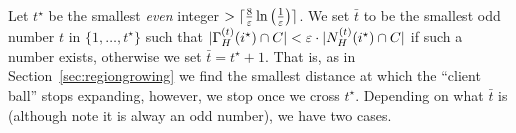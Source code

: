 \def\t{\bar{t}}
Let $t^\star$ be the smallest {\em even} integer $> \lceil\frac{8}{\varepsilon}\ln\left(\frac{1}{\varepsilon}\right)\rceil$. We set $\t$ to be the smallest odd number $t$ in $\{1,\ldots,t^\star\}$ such that $|\Gamma^{(t)}_H(i^\star)\cap C| < \varepsilon\cdot |N^{(t)}_H(i^\star)\cap C|$ if such a number exists, otherwise we set $\t = t^\star + 1$.  That is, as in Section~\ref{sec:regiongrowing} we find the smallest distance at which the ``client ball'' stops expanding, however, we stop once we cross $t^\star$. Depending on what $\t$ is (although note it is alway an odd number), we have two cases.
%
